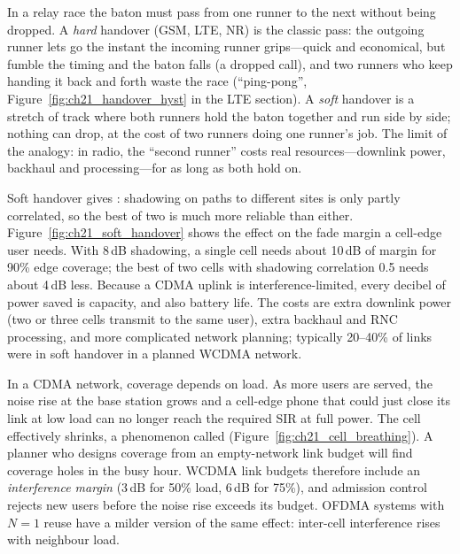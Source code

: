 \begin{analogy}
In a relay race the baton must pass from one runner to the next without being dropped. A
\emph{hard} handover (GSM, LTE, NR) is the classic pass: the outgoing runner lets go the instant the
incoming runner grips---quick and economical, but fumble the timing and the baton falls (a dropped
call), and two runners who keep handing it back and forth waste the race (``ping-pong'',
Figure~\ref{fig:ch21_handover_hyst} in the LTE section). A \emph{soft} handover is a stretch of track
where both runners hold the baton together and run side by side; nothing can drop, at the cost of
two runners doing one runner's job. The limit of the analogy: in radio, the ``second runner'' costs
real resources---downlink power, backhaul and processing---for as long as both hold on.
\end{analogy}

Soft handover gives : shadowing on paths to different sites is only partly
correlated, so the best of two is much more reliable than either.
Figure~\ref{fig:ch21_soft_handover} shows the effect on the fade margin a cell-edge user needs. With
8\,dB shadowing, a single cell needs about 10\,dB of margin for 90\% edge coverage; the best of two
cells with shadowing correlation 0.5 needs about 4\,dB less. Because a CDMA uplink is
interference-limited, every decibel of power saved is capacity, and also battery life. The costs are
extra downlink power (two or three cells transmit to the same user), extra backhaul and RNC
processing, and more complicated network planning; typically 20--40\% of links were in soft handover
in a planned WCDMA network.

\begin{pitfall}
In a CDMA network, coverage depends on load. As more users are served, the noise rise at the base
station grows and a cell-edge phone that could just close its link at low load can no longer reach
the required SIR at full power. The cell effectively shrinks, a phenomenon called
 (Figure~\ref{fig:ch21_cell_breathing}). A planner who designs coverage from an
empty-network link budget will find coverage holes in the busy hour. WCDMA link budgets therefore
include an \emph{interference margin} (3\,dB for 50\% load, 6\,dB for 75\%), and admission control
rejects new users before the noise rise exceeds its budget. OFDMA systems with $N=1$ reuse have a
milder version of the same effect: inter-cell interference rises with neighbour load.
\end{pitfall}

